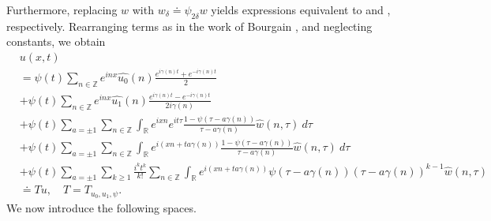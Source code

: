 \documentclass[12pt,reqno]{amsart}
\numberwithin{equation}{section}  %
\renewcommand{\cref}{\Cref}
\newcommand{\rr}{\mathbb{R}}
\newcommand{\zz}{\mathbb{Z}}
\newcommand{\wh}{\widehat}
\begin{document}
Furthermore, replacing
$w$ with $w_{\delta} \doteq \psi_{2 \delta} w$ yields expressions equivalent
to \cref{term-3} and \cref{term-4}, respectively.
Rearranging terms as in the work of Bourgain \cite{Bourgain:1993ju}, and neglecting constants, we obtain
%
%
%
%
%
\begin{align}
  & u(x,t)
  \label{main1-rel-term-0}
  \\
  \label{main1-rel-term-1}
  & = \psi(t) \sum_{n \in \zz} e^{inx} \wh{u_{0}}(n) \frac{e^{i\gamma(n)t} + e^{-i\gamma(n)t}}{2} 
  \\
  \label{main1-rel-term-2}
  & + \psi(t) \sum_{n \in \zz} e^{inx}
  \wh{u_{1}}(n)\frac{e^{i\gamma(n)t} - e^{-i\gamma(n)t}}{2 i \gamma(n)} 
  \\
  \label{main1-rel-term-3}
  & +  \psi(t)\sum_{a = \pm 1} \sum_{n\in \zz} \int_\rr e^{ixn}  
  e^{it \tau} \frac{1 - \psi(\tau -  a\gamma(n)) 
}{\tau -  a\gamma(n)} \wh{w}(n, \tau) \ d \tau
  \\
  \label{main1-rel-term-4}
  & + \psi(t) \sum_{a = \pm 1} \sum_{n\in \zz} \int_\rr e^{i(xn + 
  t a\gamma(n))}
  \frac{1- \psi(\tau -  a\gamma(n))}{\tau -  a\gamma(n)} \wh{w}(n, \tau) \ d \tau
  \\
  \label{main1-rel-term-4.5}
  & +  \psi(t) \sum_{a = \pm 1}  \sum_{k \ge 1} \frac{i^k t^k}{k!}
  \sum_{n \in \zz} \int_\rr e^{i(xn + t a\gamma(n) )}
  \psi(\tau -  a\gamma(n)) (\tau -  a\gamma(n))^{k-1} \wh{w}(n, \tau)
  \\
  \label{main1-rel-term-5}
  & \doteq Tu, \quad T=T_{u_0, u_1, \psi}.
\end{align}
%
%
%
%
%
%
%
%
%
%
%
%
We now introduce the following spaces. 
%
%
\end{document}
